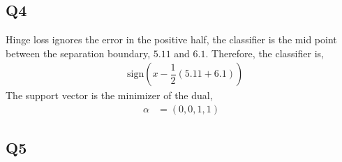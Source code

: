 \documentclass{article}
\begin{document}
\subsection{Q4}
Hinge loss ignores the error in the positive half, the classifier is the mid point between the separation boundary, $5.11$ and $6.1$. Therefore, the classifier is,
\begin{align*}
&\text{sign}\left(x - \dfrac{1}{2} \left(5.11 + 6.1\right)\right)
\end{align*}
The support vector is the minimizer of the dual,
\begin{align*}
\alpha &= \left(0, 0, 1, 1\right)
\end{align*}


\subsection{Q5}
\end{document}
